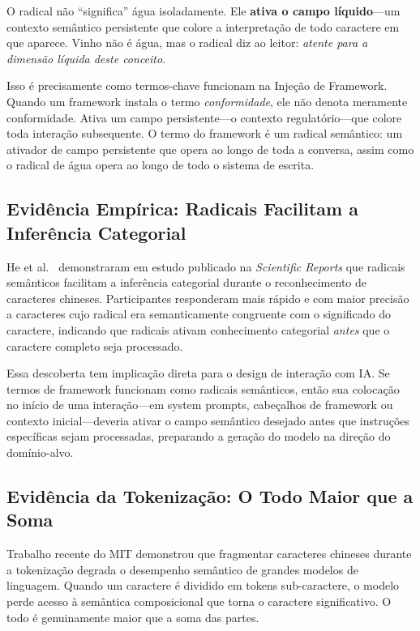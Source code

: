 \documentclass[12pt,a4paper]{article}
\begin{document}
O radical não ``significa'' água isoladamente.
Ele \textbf{ativa o campo líquido}---um contexto semântico persistente que colore a interpretação de todo caractere em que aparece.
Vinho não é água, mas o radical diz ao leitor: \textit{atente para a dimensão líquida deste conceito}.

Isso é precisamente como termos-chave funcionam na Injeção de Framework.
Quando um framework instala o termo \textit{conformidade}, ele não denota meramente conformidade.
Ativa um campo persistente---o contexto regulatório---que colore toda interação subsequente.
O termo do framework é um radical semântico: um ativador de campo persistente que opera ao longo de toda a conversa, assim como o radical de água opera ao longo de todo o sistema de escrita.

\subsection{Evidência Empírica: Radicais Facilitam a Inferência Categorial}

He et al.\ \cite{he2018} demonstraram em estudo publicado na \textit{Scientific Reports} que radicais semânticos facilitam a inferência categorial durante o reconhecimento de caracteres chineses.
Participantes responderam mais rápido e com maior precisão a caracteres cujo radical era semanticamente congruente com o significado do caractere, indicando que radicais ativam conhecimento categorial \textit{antes} que o caractere completo seja processado.

Essa descoberta tem implicação direta para o design de interação com IA.
Se termos de framework funcionam como radicais semânticos, então sua colocação no início de uma interação---em system prompts, cabeçalhos de framework ou contexto inicial---deveria ativar o campo semântico desejado antes que instruções específicas sejam processadas, preparando a geração do modelo na direção do domínio-alvo.

\subsection{Evidência da Tokenização: O Todo Maior que a Soma}

Trabalho recente do MIT \cite{cao2025} demonstrou que fragmentar caracteres chineses durante a tokenização degrada o desempenho semântico de grandes modelos de linguagem.
Quando um caractere é dividido em tokens sub-caractere, o modelo perde acesso à semântica composicional que torna o caractere significativo.
O todo é genuinamente maior que a soma das partes.
\end{document}
